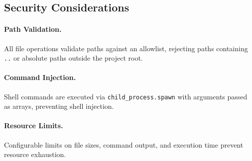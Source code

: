 \subsection{Security Considerations}

\paragraph{Path Validation.} All file operations validate paths against an allowlist, rejecting paths containing \texttt{..} or absolute paths outside the project root.

\paragraph{Command Injection.} Shell commands are executed via \texttt{child\_process.spawn} with arguments passed as arrays, preventing shell injection.

\paragraph{Resource Limits.} Configurable limits on file sizes, command output, and execution time prevent resource exhaustion.

